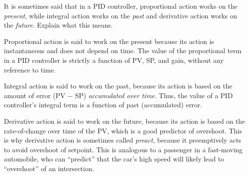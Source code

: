 

It is sometimes said that in a PID controller, proportional action works on the {\it present}, while integral action works on the {\it past} and derivative action works on the {\it future}.  Explain what this means.







Proportional action is said to work on the present because its action is instantaneous and does not depend on time.  The value of the proportional term in a PID controller is strictly a function of PV, SP, and gain, without any reference to time.
 
Integral action is said to work on the past, because its action is based on the amount of error (PV $-$ SP) {\it accumulated over time}.  Thus, the value of a PID controller's integral term is a function of past (accumulated) error.

Derivative action is said to work on the future, because its action is based on the rate-of-change over time of the PV, which is a good predictor of overshoot.  This is why derivative action is sometimes called {\it preact}, because it preemptively acts to avoid overshoot of setpoint.  This is analogous to a passenger in a fast-moving automobile, who can ``predict'' that the car's high speed will likely lead to ``overshoot'' of an intersection.











